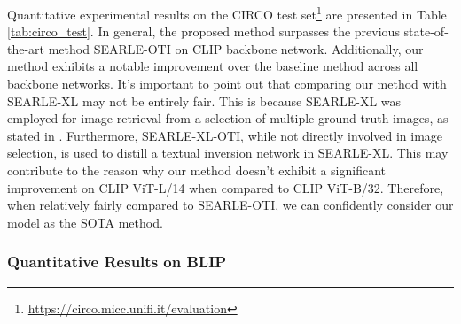 \documentclass[10pt,twocolumn,letterpaper]{article}
\begin{document}
Quantitative experimental results on the CIRCO test set\footnote{\url{https://circo.micc.unifi.it/evaluation}} are presented in Table \ref{tab:circo_test}. In general, the proposed method surpasses the previous state-of-the-art method SEARLE-OTI on CLIP backbone network. Additionally, our method exhibits a notable improvement over the baseline method across all backbone networks. It's important to point out that comparing our method with SEARLE-XL may not be entirely fair. This is because SEARLE-XL was employed for image retrieval from a selection of multiple ground truth images, as stated in \cite{Baldrati_2023_ICCV}. Furthermore, SEARLE-XL-OTI, while not directly involved in image selection, is used to distill a textual inversion network in SEARLE-XL. This may contribute to the reason why our method doesn't exhibit a significant improvement on CLIP ViT-L/14 when compared to CLIP ViT-B/32. Therefore, when relatively fairly compared to SEARLE-OTI, we can confidently consider our model as the SOTA method. 


\subsubsection{Quantitative Results on BLIP}
\begin{table}[!ht]
\centering
\Huge
  \caption{Quantitative evaluation results on FashionIQ validation set. The best scores are highlighted in bold. }
  \label{tab:fashioniq_val_blip}
\end{table}
\end{document}
